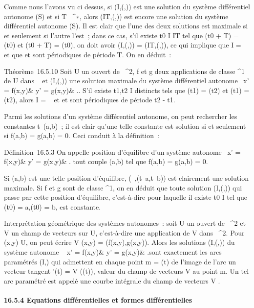 Comme nous l'avons vu ci dessus, si (I,(\phi,\psi)) est une solution du
système différentiel autonome (S) et si T \in {}~^∗, alors
(IT,(\phiT,\psiT)) est encore une solution du
système différentiel autonome (S). Il est clair que l'une des deux
solutions est maximale si et seulement si l'autre l'est~; dans ce cas,
s'il existe t0 \in I \bigcap IT tel que \phi(t0 + T)
= \phi(t0) et \psi(t0 + T) = \psi(t0), on doit
avoir (I,(\phi,\psi)) = (IT,(\phiT,\psiT)), ce qui
implique que I = ~ et que \phi et \psi sont périodiques de période T. On en
déduit~:

Théorème~16.5.10 Soit U un ouvert de ~^2, f et g deux
applications de classe ^1 de U dans ~ et (I,(\phi,\psi)) une
solution maximale du système différentiel autonome \left
\ \cases x' = f(x,y)&
\cr y' = g(x,y)&  \right .. S'il existe
t1,t2 \in I distincts tels que \phi(t1) =
\phi(t2) et \psi(t1) = \psi(t2), alors I = ~ et \phi
et \psi sont périodiques de période t2 - t1.

Parmi les solutions d'un système différentiel autonome, on peut
rechercher les constantes t\mapsto~(a,b)~; il est
clair qu'une telle constante est solution si et seulement si f(a,b) =
g(a,b) = 0. Ceci conduit à la définition~:

Définition~16.5.3 On appelle position d'équilibre d'un système autonome
\left \ \cases x' =
f(x,y)& \cr y' = g(x,y)&  \right .
tout couple (a,b) tel que f(a,b) = g(a,b) = 0.

Si (a,b) est une telle position d'équilibre,
(~,(t\mapsto~a,t\mathrel\mapsto~b)) est
clairement une solution maximale. Si f et g sont de classe
^1, on en déduit que toute solution (I,(\phi,\psi)) qui passe par
cette position d'équilibre, c'est-à-dire pour laquelle il existe
t0 \in I tel que \phi(t0) = a,\psi(t0) = b, est
constante.

Interprétation géométrique des systèmes autonomes~: soit U un ouvert de
~^2 et V un champ de vecteurs sur U, c'est-à-dire une
application de V dans ~^2. Pour (x,y) \in U, on peut écrire V
(x,y) = (f(x,y),g(x,y)). Alors les solutions (I,(\phi,\psi)) du système
autonome \left \ \cases
x' = f(x,y)& \cr y' = g(x,y)&  \right
.sont exactement les arcs paramétrés (I,\Phi) qui admettent en chaque point
m = \Phi(t) de l'image de l'arc un vecteur tangent \Phi'(t) = V (\Phi(t)), valeur
du champ de vecteurs V au point m. Un tel arc paramétré est appelé une
courbe intégrale du champ de vecteurs V .

\paragraph{16.5.4 Equations différentielles et formes différentielles}

